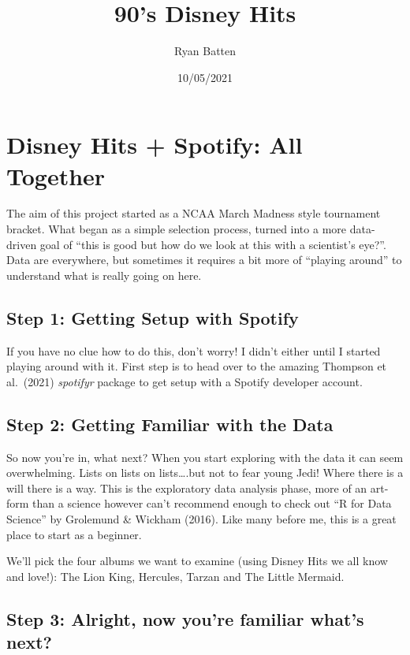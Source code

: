 \documentclass[
]{article}
\title{90's Disney Hits}
\author{Ryan Batten}
\date{10/05/2021}
\begin{document}
\maketitle

\hypertarget{disney-hits-spotify-all-together}{%
\section{Disney Hits + Spotify: All
Together}\label{disney-hits-spotify-all-together}}

The aim of this project started as a NCAA March Madness style tournament
bracket. What began as a simple selection process, turned into a more
data-driven goal of ``this is good but how do we look at this with a
scientist's eye?''. Data are everywhere, but sometimes it requires a bit
more of ``playing around'' to understand what is really going on here.

\hypertarget{step-1-getting-setup-with-spotify}{%
\subsection{Step 1: Getting Setup with
Spotify}\label{step-1-getting-setup-with-spotify}}

If you have no clue how to do this, don't worry! I didn't either until I
started playing around with it. First step is to head over to the
amazing Thompson et al.~(2021) \emph{spotifyr} package to get setup with
a Spotify developer account.

\hypertarget{step-2-getting-familiar-with-the-data}{%
\subsection{Step 2: Getting Familiar with the
Data}\label{step-2-getting-familiar-with-the-data}}

So now you're in, what next? When you start exploring with the data it
can seem overwhelming. Lists on lists on lists\ldots.but not to fear
young Jedi! Where there is a will there is a way. This is the
exploratory data analysis phase, more of an art-form than a science
however can't recommend enough to check out ``R for Data Science'' by
Grolemund \& Wickham (2016). Like many before me, this is a great place
to start as a beginner.

We'll pick the four albums we want to examine (using Disney Hits we all
know and love!): The Lion King, Hercules, Tarzan and The Little Mermaid.

\hypertarget{step-3-alright-now-youre-familiar-whats-next}{%
\subsection{Step 3: Alright, now you're familiar what's
next?}\label{step-3-alright-now-youre-familiar-whats-next}}
\end{document}
